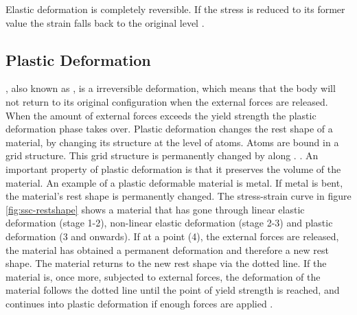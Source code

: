 Elastic deformation is
completely reversible. If the stress is reduced to its former value
the strain falls back to the original level
.

\subsection{Plastic Deformation}
, also known as , is a
irreversible deformation, which means that the body will not return to
its original configuration when the external forces are released. When
the amount of external forces exceeds the yield strength the plastic
deformation phase takes over.
%
Plastic deformation changes the rest shape of a material, by
changing its structure at the level of atoms. Atoms
are bound in a grid structure. This grid structure is
permanently changed by  along .
.
%
An important property of plastic deformation is that it preserves the
volume of the material.
%
An example of a plastic deformable material is metal. If metal is
bent, the material's rest shape is permanently changed.
%
The stress-strain curve in figure \vref{fig:ssc-restshape} shows a
material that has gone through linear elastic deformation (stage 1-2),
non-linear elastic deformation (stage 2-3) and plastic deformation (3
and onwards). If at a point (4), the external forces are 
released, the material has obtained a permanent deformation and
therefore a new rest shape. The material returns to the new rest
shape via the dotted line.
%
If the material is, once more, subjected to external forces, the
deformation of the material follows the dotted line until the point of
yield strength is reached, and continues into plastic deformation if
enough forces are applied .

